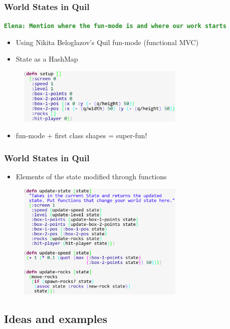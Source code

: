 \documentclass{beamer}
\newcommand{\comment}[1]{{\bf \tt  {#1}}}
\newcommand{\emcomment}[1]{\textcolor{ForestGreen}{\comment{Elena: {#1}}}}
\begin{document}
\begin{frame}
\frametitle{World States in Quil}
\emcomment{Mention where the fun-mode is and where our work starts}
	\begin{itemize}
		\item  Using Nikita Beloglazov's  Quil fun-mode (functional MVC)
		\item State as a HashMap
	\end{itemize}
	\begin{figure}
		\includegraphics[width=8cm]{PresentationImages/setupCode.pdf}
	\end{figure}
	\begin{itemize}
		\item fun-mode + first class shapes = super-fun!
	\end{itemize}
\end{frame}

\begin{frame}
\frametitle{World States in Quil}
\begin{itemize}
		\item Elements of the state modified through functions
	\end{itemize}
	\begin{figure}
		\includegraphics[width=8cm]{PresentationImages/updateCode.pdf}
	\end{figure}
\end{frame}




\subsection{Ideas and examples}
\end{document}
